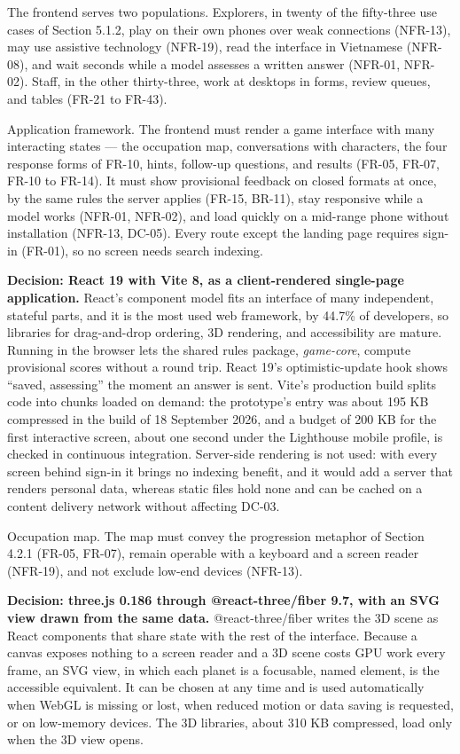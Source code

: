 The frontend serves two populations. Explorers, in twenty of the fifty-three use cases of Section 5.1.2, play on their own phones over weak connections (NFR-13), may use assistive technology (NFR-19), read the interface in Vietnamese (NFR-08), and wait seconds while a model assesses a written answer (NFR-01, NFR-02). Staff, in the other thirty-three, work at desktops in forms, review queues, and tables (FR-21 to FR-43).

Application framework. The frontend must render a game interface with many interacting states --- the occupation map, conversations with characters, the four response forms of FR-10, hints, follow-up questions, and results (FR-05, FR-07, FR-10 to FR-14). It must show provisional feedback on closed formats at once, by the same rules the server applies (FR-15, BR-11), stay responsive while a model works (NFR-01, NFR-02), and load quickly on a mid-range phone without installation (NFR-13, DC-05). Every route except the landing page requires sign-in (FR-01), so no screen needs search indexing.

\textbf{Decision: React 19 with Vite 8, as a client-rendered single-page application.} React's component model fits an interface of many independent, stateful parts, and it is the most used web framework, by 44.7\% of developers\cite{r136}, so libraries for drag-and-drop ordering, 3D rendering, and accessibility are mature. Running in the browser lets the shared rules package, \textit{game-core}, compute provisional scores without a round trip. React 19's optimistic-update hook shows ``saved, assessing'' the moment an answer is sent\cite{r137}. Vite's production build splits code into chunks loaded on demand\cite{r138}: the prototype's entry was about 195 KB compressed in the build of 18 September 2026, and a budget of 200 KB for the first interactive screen, about one second under the Lighthouse mobile profile\cite{r139}, is checked in continuous integration. Server-side rendering is not used: with every screen behind sign-in it brings no indexing benefit, and it would add a server that renders personal data, whereas static files hold none and can be cached on a content delivery network without affecting DC-03.

Occupation map. The map must convey the progression metaphor of Section 4.2.1 (FR-05, FR-07), remain operable with a keyboard and a screen reader (NFR-19), and not exclude low-end devices (NFR-13).

\textbf{Decision: three.js 0.186 through @react-three/fiber 9.7, with an SVG view drawn from the same data.} @react-three/fiber writes the 3D scene as React components that share state with the rest of the interface\cite{r140}. Because a canvas exposes nothing to a screen reader and a 3D scene costs GPU work every frame\cite{r141}, an SVG view, in which each planet is a focusable, named element\cite{r142}, is the accessible equivalent. It can be chosen at any time and is used automatically when WebGL is missing or lost, when reduced motion or data saving is requested, or on low-memory devices. The 3D libraries, about 310 KB compressed, load only when the 3D view opens.

